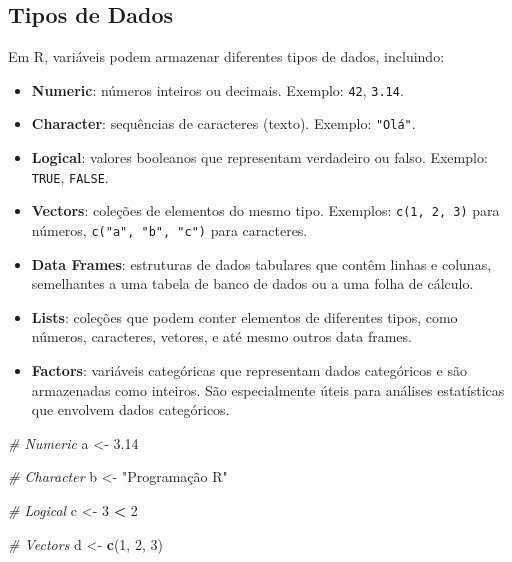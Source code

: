 \documentclass[
]{book}
\newenvironment{Shaded}{\begin{snugshade}}{\end{snugshade}}
\newcommand{\CommentTok}[1]{\textcolor[rgb]{0.56,0.35,0.01}{\textit{#1}}}
\newcommand{\DecValTok}[1]{\textcolor[rgb]{0.00,0.00,0.81}{#1}}
\newcommand{\FloatTok}[1]{\textcolor[rgb]{0.00,0.00,0.81}{#1}}
\newcommand{\FunctionTok}[1]{\textcolor[rgb]{0.13,0.29,0.53}{\textbf{#1}}}
\newcommand{\NormalTok}[1]{#1}
\newcommand{\OtherTok}[1]{\textcolor[rgb]{0.56,0.35,0.01}{#1}}
\newcommand{\SpecialCharTok}[1]{\textcolor[rgb]{0.81,0.36,0.00}{\textbf{#1}}}
\newcommand{\StringTok}[1]{\textcolor[rgb]{0.31,0.60,0.02}{#1}}
\providecommand{\tightlist}{%
  \setlength{\itemsep}{0pt}\setlength{\parskip}{0pt}}
\begin{document}
\subsection{Tipos de Dados}\label{tipos-de-dados}

Em R, variáveis podem armazenar diferentes tipos de dados, incluindo:

\begin{itemize}
\tightlist
\item
  \textbf{Numeric}: números inteiros ou decimais. Exemplo: \texttt{42}, \texttt{3.14}.
\item
  \textbf{Character}: sequências de caracteres (texto). Exemplo: \texttt{"Olá"}.
\item
  \textbf{Logical}: valores booleanos que representam verdadeiro ou falso.
  Exemplo: \texttt{TRUE}, \texttt{FALSE}.
\item
  \textbf{Vectors}: coleções de elementos do mesmo tipo. Exemplos:
  \texttt{c(1,\ 2,\ 3)} para números, \texttt{c("a",\ "b",\ "c")} para caracteres.
\item
  \textbf{Data Frames}: estruturas de dados tabulares que contêm linhas e
  colunas, semelhantes a uma tabela de banco de dados ou a uma folha
  de cálculo.
\item
  \textbf{Lists}: coleções que podem conter elementos de diferentes tipos,
  como números, caracteres, vetores, e até mesmo outros data frames.
\item
  \textbf{Factors}: variáveis categóricas que representam dados categóricos
  e são armazenadas como inteiros. São especialmente úteis para
  análises estatísticas que envolvem dados categóricos.
\end{itemize}

\begin{Shaded}
\begin{Highlighting}[]
\CommentTok{\# Numeric}
\NormalTok{a }\OtherTok{\textless{}{-}} \FloatTok{3.14}

\CommentTok{\# Character}
\NormalTok{b }\OtherTok{\textless{}{-}} \StringTok{"Programação R"}

\CommentTok{\# Logical}
\NormalTok{c }\OtherTok{\textless{}{-}} \DecValTok{3} \SpecialCharTok{\textless{}} \DecValTok{2}

\CommentTok{\# Vectors}
\NormalTok{d }\OtherTok{\textless{}{-}} \FunctionTok{c}\NormalTok{(}\DecValTok{1}\NormalTok{, }\DecValTok{2}\NormalTok{, }\DecValTok{3}\NormalTok{)}
\end{Highlighting}
\end{Shaded}
\end{document}
